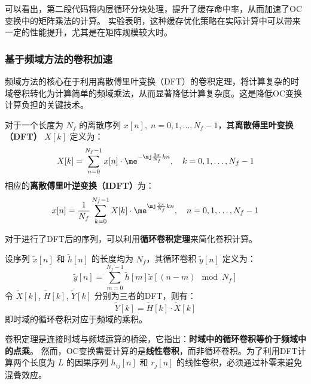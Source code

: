 可以看出，第二段代码将内层循环分块处理，提升了缓存命中率，从而加速了OC变换中的矩阵乘法的计算。
实验表明，这种缓存优化策略在实际计算中可以带来一定的性能提升，尤其是在矩阵规模较大时。

\subsubsection{基于频域方法的卷积加速}

频域方法的核心在于利用离散傅里叶变换（DFT）的卷积定理，将计算复杂的时域卷积转化为计算简单的频域乘法，从而显著降低计算复杂度。这是降低OC变换计算负担的关键技术。

\begin{definition}
    对于一个长度为 $N_f$ 的离散序列 $x[n],\; n=0,1,\dots,N_f-1$，其\textbf{离散傅里叶变换（DFT） }$X[k]$ 定义为：
    \begin{equation}
        X[k] = \sum_{n=0}^{N_f-1} x[n] \cdot \me^{-\mj\frac{2\pi}{N_f}kn}, \quad k=0,1,\dots,N_f-1
    \end{equation}
    相应的\textbf{离散傅里叶逆变换（IDFT）}为：
    \begin{equation}
        x[n] = \dfrac{1}{N_f} \sum_{k=0}^{N_f-1} X[k] \cdot \me^{\mj\frac{2\pi}{N_f}kn}, \quad n=0,1,\dots,N_f-1
    \end{equation}
\end{definition}

对于进行了DFT后的序列，可以利用\textbf{循环卷积定理}来简化卷积计算。

\begin{theorem}[循环卷积定理]
    \label{thm:circular-conv}
    设序列 $\tilde{x}[n]$ 和 $\tilde{h}[n]$ 的长度均为 $N_f$，其循环卷积 $\tilde{y}[n]$ 定义为：
    \begin{equation}
        \tilde{y}[n] = \sum_{m=0}^{N_f-1} \tilde{h}[m] \tilde{x}[(n-m) \mod N_f]
    \end{equation}
    令 $\tilde{X}[k]$, $\tilde{H}[k]$, $\tilde{Y}[k]$ 分别为三者的DFT，则有：
    \begin{equation}
        \tilde{Y}[k] = \tilde{H}[k] \cdot \tilde{X}[k]
    \end{equation}
    即时域的循环卷积对应于频域的乘积。
\end{theorem}

卷积定理是连接时域与频域运算的桥梁，它指出：\textbf{时域中的循环卷积等价于频域中的点乘}。
然而，OC变换需要计算的是\textbf{线性卷积}，而非循环卷积。为了利用DFT计算两个长度为 $L$ 的因果序列 $h_{ij}[n]$ 和 $r_j[n]$ 的线性卷积，必须通过补零来避免混叠效应。

